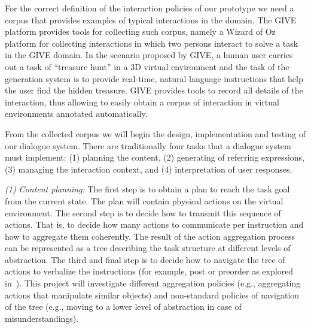
For the correct definition of the interaction policies of our prototype we need
a corpus that provides examples of typical interactions in the domain. The GIVE
platform provides tools for collecting such corpus, namely a Wizard of Oz
platform for collecting interactions in which two persons interact to solve a
task in the GIVE domain. In the scenario proposed by GIVE, a
human user carries out a task of ``treasure hunt'' in a 3D virtual environment
and the task of the generation system is to provide real-time, natural
language instructions that help the user find the hidden treasure. GIVE
provides tools to record all details of the interaction, thus
allowing to easily obtain a corpus of interaction in virtual environments
annotated automatically.

From the collected corpus we will begin the design, implementation and testing
of our dialogue system. There are traditionally four tasks
that a dialogue system must implement: (1) planning the content, (2)
generating of referring expressions, (3) managing the interaction context, and
(4) interpretation of user responses. 

\emph{(1) Content planning:} The first step is to obtain a plan to reach the
task goal from the current state.
The plan will contain physical actions on the virtual environment. The second
step is to decide how to transmit this sequence of actions. That is, to decide
how many actions to communicate per instruction and how to aggregate them
coherently. The result of the action aggregation process can be represented as a
tree describing the task structure at different levels of abstraction. The third
and final step is to decide how to navigate the tree of actions to verbalize the
instructions (for example, post or preorder as
explored in~\cite{foster-etal-ijcai2009}). This project will investigate
different aggregation policies (e.g., aggregating actions that
manipulate similar objects) and non-standard policies of navigation of the tree
(e.g., moving to a lower level of abstraction in case of misunderstandings).

